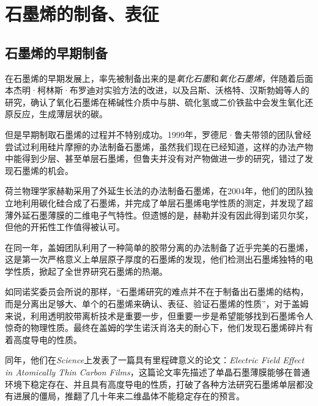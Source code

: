 
\chapter{石墨烯的制备、表征}

\section{石墨烯的早期制备}

在石墨烯的早期发展上，率先被制备出来的是\textit{氧化石墨}和\textit{氧化石墨烯}，伴随着后面本杰明·柯林斯·布罗迪对实验方法的改进，以及吕斯、沃格特、汉斯勃姆等人的研究，确认了氧化石墨烯在稀碱性介质中与肼、硫化氢或二价铁盐中会发生氧化还原反应，生成薄层状的碳。

但是早期制取石墨烯的过程并不特别成功。1999年，罗德尼·鲁夫带领的团队曾经尝试过利用硅片摩擦的办法制备石墨烯，虽然我们现在已经知道，这样的办法产物中能得到少层、甚至单层石墨烯，但鲁夫并没有对产物做进一步的研究，错过了发现石墨烯的机会。

荷兰物理学家赫勒采用了外延生长法的办法制备石墨烯，在2004年，他们的团队独立地利用碳化硅合成了石墨烯，并完成了单层石墨烯电学性质的测定，并发现了超薄外延石墨薄膜的二维电子气特性。但遗憾的是，赫勒并没有因此得到诺贝尔奖，但他的开拓性工作值得被认可。

在同一年，盖姆团队利用了一种简单的胶带分离的办法制备了近乎完美的石墨烯，这是第一次严格意义上单层原子厚度的石墨烯的发现，他们检测出石墨烯独特的电学性质，掀起了全世界研究石墨烯的热潮。

如同诺奖委员会所说的那样，“石墨烯研究的难点并不在于制备出石墨烯的结构，而是分离出足够大、单个的石墨烯来确认、表征、验证石墨烯的性质”，对于盖姆来说，利用透明胶带离析技术是重要一步，但重要一步是希望能够找到石墨烯令人惊奇的物理性质。最终在盖姆的学生诺沃肖洛夫的耐心下，他们发现石墨烯碎片有着高度导电的性质。

同年，他们在\textit{Science}上发表了一篇具有里程碑意义的论文：\textit{Electric Field Effect in Atomically Thin Carbon Films}，这篇论文率先描述了单晶石墨薄膜能够在普通环境下稳定存在、并且具有高度导电的性质，打破了各种方法研究石墨烯单层都没有进展的僵局，推翻了几十年来二维晶体不能稳定存在的预言。